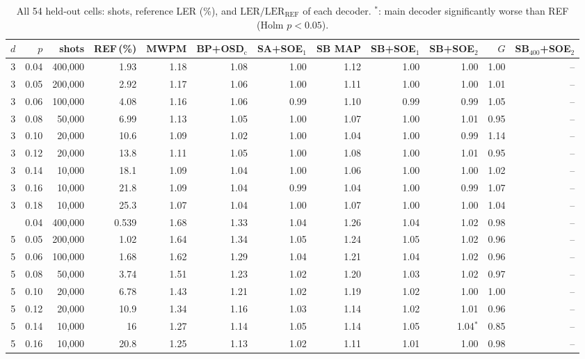 \documentclass[journal]{IEEEtran}
\newcommand{\REF}{\mathrm{REF}}
\newcommand{\LER}{\mathrm{LER}}
\begin{document}
\begin{table}[t]
\centering
\caption{All 54 held-out cells: shots, reference LER (\%), and $\LER/\LER_\REF$ of each decoder. $^{*}$: main decoder significantly worse than REF (Holm $p<0.05$).}
\label{tab:full}
\footnotesize
\setlength{\tabcolsep}{4pt}
\begin{tabular}{rrrrrrrrrrrr}
\toprule
$d$ & $p$ & shots & REF\,(\%) & MWPM & BP+OSD$_\mathrm{c}$ & SA+SOE$_1$ & SB MAP & SB+SOE$_1$ & SB+SOE$_2$ & $G$ & SB$_{400}$+SOE$_2$\\
\midrule
3 & 0.04 & 400{,}000 & 1.93 & 1.18 & 1.08 & 1.00 & 1.12 & 1.00 & 1.00 & 1.00 & -- \\
3 & 0.05 & 200{,}000 & 2.92 & 1.17 & 1.06 & 1.00 & 1.11 & 1.00 & 1.00 & 1.01 & -- \\
3 & 0.06 & 100{,}000 & 4.08 & 1.16 & 1.06 & 0.99 & 1.10 & 0.99 & 0.99 & 1.05 & -- \\
3 & 0.08 & 50{,}000 & 6.99 & 1.13 & 1.05 & 1.00 & 1.07 & 1.00 & 1.01 & 0.95 & -- \\
3 & 0.10 & 20{,}000 & 10.6 & 1.09 & 1.02 & 1.00 & 1.04 & 1.00 & 0.99 & 1.14 & -- \\
3 & 0.12 & 20{,}000 & 13.8 & 1.11 & 1.05 & 1.00 & 1.08 & 1.00 & 1.01 & 0.95 & -- \\
3 & 0.14 & 10{,}000 & 18.1 & 1.09 & 1.04 & 1.00 & 1.06 & 1.00 & 1.00 & 1.02 & -- \\
3 & 0.16 & 10{,}000 & 21.8 & 1.09 & 1.04 & 0.99 & 1.04 & 1.00 & 0.99 & 1.07 & -- \\
3 & 0.18 & 10{,}000 & 25.3 & 1.07 & 1.04 & 1.00 & 1.07 & 1.00 & 1.00 & 1.04 & -- \\
\addlinespace
5 & 0.04 & 400{,}000 & 0.539 & 1.68 & 1.33 & 1.04 & 1.26 & 1.04 & 1.02 & 0.98 & -- \\
5 & 0.05 & 200{,}000 & 1.02 & 1.64 & 1.34 & 1.05 & 1.24 & 1.05 & 1.02 & 0.96 & -- \\
5 & 0.06 & 100{,}000 & 1.68 & 1.62 & 1.29 & 1.04 & 1.21 & 1.04 & 1.02 & 0.96 & -- \\
5 & 0.08 & 50{,}000 & 3.74 & 1.51 & 1.23 & 1.02 & 1.20 & 1.03 & 1.02 & 0.97 & -- \\
5 & 0.10 & 20{,}000 & 6.78 & 1.43 & 1.21 & 1.02 & 1.19 & 1.02 & 1.00 & 1.00 & -- \\
5 & 0.12 & 20{,}000 & 10.9 & 1.34 & 1.16 & 1.03 & 1.14 & 1.02 & 1.01 & 0.96 & -- \\
5 & 0.14 & 10{,}000 & 16 & 1.27 & 1.14 & 1.05 & 1.14 & 1.05 & 1.04$^{*}$ & 0.85 & -- \\
5 & 0.16 & 10{,}000 & 20.8 & 1.25 & 1.13 & 1.02 & 1.11 & 1.01 & 1.00 & 0.98 & -- \\

\end{tabular}
\end{table}
\end{document}
